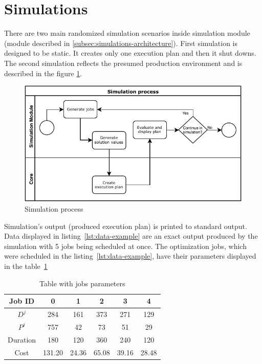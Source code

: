\section{Simulations}\label{sec:simulations}

There are two main randomized simulation scenarios inside simulation module 
(module described in \ref{subsec:simulations-architecture}).
First simulation is designed to be static.
It creates only one execution plan
and then it shut downs.
The second simulation reflects the presumed production environment
and is described in the figure \ref{fig:simulation-process}.

\begin{figure}[ht] 
	\includegraphics[width=\textwidth]{i_simulation_process.pdf} 
	\centering
	\caption{Simulation process}
	\label{fig:simulation-process}
\end{figure}

Simulation's output (produced execution plan) is printed to standard output.
Data displayed in listing~\ref{lst:data-example} are an exact output produced by the simulation with 5 jobs being scheduled at once.
The optimization jobs,
which were scheduled in the listing~\ref{lst:data-example},
have their parameters displayed in the table~\ref{table:jobs-parameters}

\begin{table}[h]
	\centering
	\caption{Table with jobs parameters}
	\begin{tabular}{|c|c c c c c|} 
		\hline
		Job ID   & 0      & 1     & 2     & 3     & 4     \\
		\hline\hline
		$D^{j}$  & 284    & 161   & 373   & 271   & 129   \\
		\hline
		$P^{j}$  & 757    & 42    & 73    & 51    & 29    \\
		\hline\hline
		Duration & 180    & 120   & 360   & 240   & 120   \\
		\hline
    Cost     & 131.20 & 24.36 & 65.08 & 39.16 & 28.48 \\
    \hline
	\end{tabular}
	\label{table:jobs-parameters}
\end{table}
 
